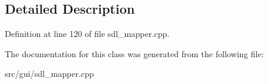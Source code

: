 \subsection{Detailed Description}


Definition at line 120 of file sdl\-\_\-mapper.\-cpp.



The documentation for this class was generated from the following file\-:\begin{DoxyCompactItemize}
\item 
src/gui/sdl\-\_\-mapper.\-cpp\end{DoxyCompactItemize}
